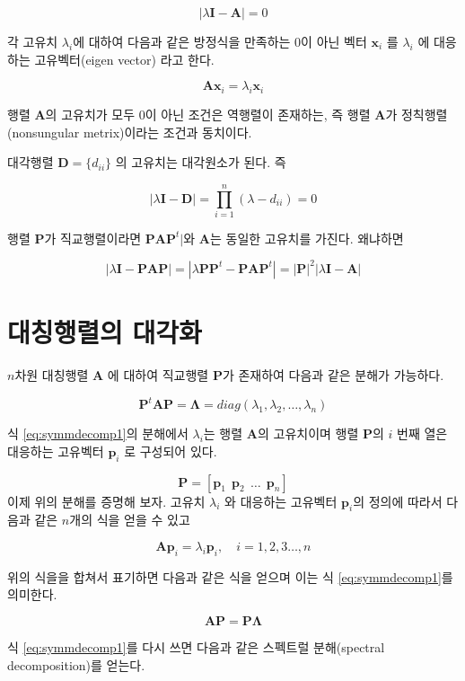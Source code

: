 \documentclass[
]{book}
\newcommand{\bm}[1]{\boldsymbol{\mathbf{#1}}}
\theoremstyle{definition}
\theoremstyle{definition}
\theoremstyle{definition}
\theoremstyle{definition}
\theoremstyle{remark}
\begin{document}
\[ | \lambda \bm I - \bm A | = 0 \]

각 고유치 \(\lambda_i\)에 대하여 다음과 같은 방정식을 만족하는 0이 아닌 벡터 \(\bm x_i\) 를 \(\lambda_i\) 에 대응하는 고유벡터(eigen vector) 라고 한다.

\[ \bm A \bm x_i = \lambda_i \bm x_i \]

행렬 \(\bm A\)의 고유치가 모두 0이 아닌 조건은 역행렬이 존재하는, 즉 행렬 \(\bm A\)가 정칙행렬(nonsungular metrix)이라는 조건과 동치이다.

대각행렬 \(\bm D = \{ d_{ii} \}\) 의 고유치는 대각원소가 된다. 즉

\[ | \lambda \bm I - \bm D | = \prod_{i=1}^n (\lambda - d_{ii}) =0 \]

행렬 \(\bm P\)가 직교행렬이라면 \(\bm P \bm A \bm P^t|\)와 \(\bm A\)는 동일한 고유치를 가진다. 왜냐하면

\[ | \lambda \bm I - \bm P \bm A \bm P | = |\lambda \bm P \bm P^t - \bm P \bm A \bm P^t| = |\bm P|^2 | \lambda \bm I - \bm A | \]

\hypertarget{uxb300uxce6duxd589uxb82cuxc758-uxb300uxac01uxd654}{%
\section{대칭행렬의 대각화}\label{uxb300uxce6duxd589uxb82cuxc758-uxb300uxac01uxd654}}

\(n\)차원 대칭행렬 \(\bm A\) 에 대하여 직교행렬 \(\bm P\)가 존재하여 다음과 같은 분해가 가능하다.

\begin{equation}
 \bm P^t \bm A \bm P = \bm \Lambda = diag(\lambda_1, \lambda_2, \dots, \lambda_n) 
 \label{eq:symmdecomp1}
\end{equation}

식 \eqref{eq:symmdecomp1}의 분해에서 \(\lambda_i\)는 행렬 \(\bm A\)의 고유치이며 행렬 \(\bm P\)의 \(i\) 번째 열은 대응하는 고유벡터 \(\bm p_i\) 로 구성되어 있다.

\[ \bm P = [ \bm p_1~~ \bm p_2 ~~ \dots ~~ \bm p_n ] \]
이제 위의 분해를 증명해 보자. 고유치 \(\lambda_i\) 와 대응하는 고유벡터 \(\bm p_i\)의 정의에 따라서 다음과 같은 \(n\)개의 식을 얻을 수 있고

\[ \bm A \bm p_i = \lambda_i \bm p_i , \quad i=1,2,3\dots, n \]

위의 식을을 합쳐서 표기하면 다음과 같은 식을 얻으며 이는 식 \eqref{eq:symmdecomp1}를 의미한다.

\[ \bm A \bm P = \bm P \bm \Lambda \]

식 \eqref{eq:symmdecomp1}를 다시 쓰면 다음과 같은 스펙트럴 분해(spectral decomposition)를 얻는다.
\end{document}
